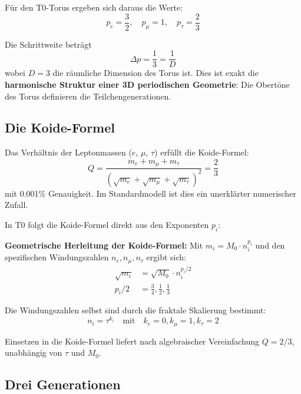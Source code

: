 	Für den T0-Torus ergeben sich daraus die Werte:
	\begin{equation}
		p_e = \frac{3}{2}, \quad p_\mu = 1, \quad p_\tau = \frac{2}{3}
	\end{equation}
	
	Die Schrittweite beträgt
	\begin{equation}
		\Delta p = \frac{1}{3} = \frac{1}{D}
	\end{equation}
	wobei $D = 3$ die räumliche Dimension des Torus ist. Dies ist exakt die \textbf{harmonische Struktur einer 3D periodischen Geometrie}: Die Obertöne des Torus definieren die Teilchengenerationen.
	
	\subsection{Die Koide-Formel}
	
	Das Verhältnis der Leptonmassen ($e$, $\mu$, $\tau$) erfüllt die Koide-Formel:
	\begin{equation}
		Q = \frac{m_e + m_\mu + m_\tau}{\left(\sqrt{m_e} + \sqrt{m_\mu} + \sqrt{m_\tau}\right)^2} = \frac{2}{3}
		\label{eq:koide}
	\end{equation}
	mit 0.001\% Genauigkeit. Im Standardmodell ist dies ein unerklärter numerischer Zufall.
	
	In T0 folgt die Koide-Formel direkt aus den Exponenten $p_i$:
	
	\textbf{Geometrische Herleitung der Koide-Formel:}
		Mit $m_i = M_0 \cdot n_i^{p_i}$ und den spezifischen Windungszahlen $n_e, n_\mu, n_\tau$ ergibt sich:
		\begin{align}
			\sqrt{m_i} &= \sqrt{M_0} \cdot n_i^{p_i/2} \\
			p_i/2 &= \frac{3}{4}, \frac{1}{2}, \frac{1}{3}
		\end{align}
		
		Die Windungszahlen selbst sind durch die fraktale Skalierung bestimmt:
		\begin{equation}
			n_i = \tau^{k_i} \quad \text{mit} \quad k_e = 0, k_\mu = 1, k_\tau = 2
		\end{equation}
		
		Einsetzen in die Koide-Formel liefert nach algebraischer Vereinfachung $Q = 2/3$, unabhängig von $\tau$ und $M_0$.
	
	\subsection{Drei Generationen}
	
